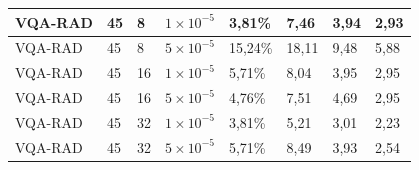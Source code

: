 \begin{longtable}[c]{|l|l|l|l|l|l|l|l|}
    VQA-RAD & 45 & 8  & $1 \times 10^{-5}$ & 3,81\%  & 7,46  & 3,94  & 2,93  \\ \hline
    VQA-RAD & 45 & 8  & $5 \times 10^{-5}$ & 15,24\% & 18,11 & 9,48  & 5,88  \\ \hline
    VQA-RAD & 45 & 16 & $1 \times 10^{-5}$ & 5,71\%  & 8,04  & 3,95  & 2,95  \\ \hline
    VQA-RAD & 45 & 16 & $5 \times 10^{-5}$ & 4,76\%  & 7,51  & 4,69  & 2,95  \\ \hline
    VQA-RAD & 45 & 32 & $1 \times 10^{-5}$ & 3,81\%  & 5,21  & 3,01  & 2,23  \\ \hline
    VQA-RAD & 45 & 32 & $5 \times 10^{-5}$ & 5,71\%  & 8,49  & 3,93  & 2,54  \\ \hline
    \end{longtable}




